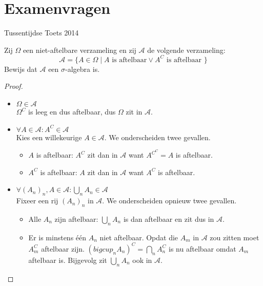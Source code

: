\documentclass[main.tex]{subfiles}
\begin{document}
\chapter{Examenvragen}
\label{cha:examenvragen}


\begin{examenvraag}{Tussentijdse Toets 2014}
  \begin{ex-vraag}
  Zij $\Omega$ een niet-aftelbare verzameling en zij $\mathcal{A}$ de volgende verzameling:
  \[ \mathcal{A} = \{ A \in \Omega \mid A \text{ is aftelbaar} \vee A^{C} \text{ is aftelbaar } \} \]
  Bewijs dat $\mathcal{A}$ een $\sigma$-algebra is.
  \end{ex-vraag}

  \begin{ex-antwoord}
    \begin{proof}
      \begin{itemize}
      \item $\Omega \in \mathcal{A}$\\
        $\Omega^{C}$ is leeg en dus aftelbaar, dus $\Omega$ zit in $\mathcal{A}$.
      \item $\forall A \in \mathcal{A}: A^{C}\in \mathcal{A}$\\
        Kies een willekeurige $A \in \mathcal{A}$. 
        We onderscheiden twee gevallen.
        \begin{itemize}
        \item $A$ is aftelbaar: $A^{C}$ zit dan in $\mathcal{A}$ want $A^{C^{C}} = A$ is aftelbaar.
        \item $A^{C}$ is aftelbaar: $A$ zit dan in $\mathcal{A}$ want $A^{C}$ is aftelbaar.
        \end{itemize}
      \item $\forall (A_{n})_{n}, A\in \mathcal{A}: \bigcup_{n} A_{n} \in \mathcal{A}$\\
        Fixeer een rij $(A_{n})_{n}$ in $\mathcal{A}$.
        We onderscheiden opnieuw twee gevallen.
        \begin{itemize}
        \item Alle $A_{n}$ zijn aftelbaar: $\bigcup_{n}A_{n}$ is dan aftelbaar en zit dus in $\mathcal{A}$.
        \item Er is minstens \'e\'en $A_{n}$ niet aftelbaar. Opdat die $A_{m}$ in $\mathcal{A}$ zou zitten moet $A_{m}^{C}$ aftelbaar zijn.
          $\left(bigcup_{n}A_{n}\right)^{C} = \bigcap_{n}A_{n}^{C}$ is nu aftelbaar omdat $A_{m}$ aftelbaar is.
          Bijgevolg zit $\bigcup_{n}A_{n}$ ook in $\mathcal{A}$.
        \end{itemize}
      \end{itemize}
    \end{proof}
  \end{ex-antwoord}
\end{examenvraag}
\end{document}
